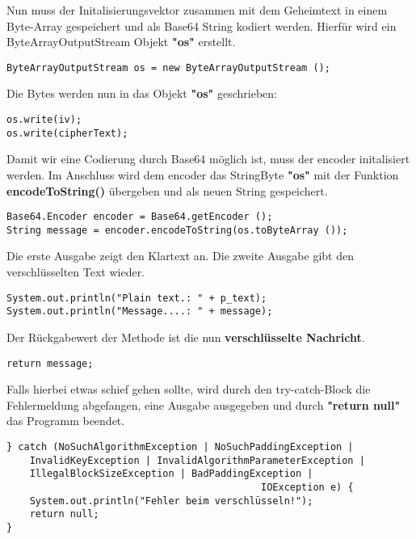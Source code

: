 \documentclass[12pt]{article}
\begin{document}
Nun muss der Initalisierungsvektor zusammen mit dem Geheimtext in einem Byte-Array gespeichert und als Base64 String kodiert werden. Hierfür wird ein ByteArrayOutputStream Objekt \textbf{"os"} erstellt.
\begin{lstlisting}
ByteArrayOutputStream os = new ByteArrayOutputStream ();
\end{lstlisting}
Die Bytes werden nun in das Objekt \textbf{"os"} geschrieben:
\begin{lstlisting}
os.write(iv);
os.write(cipherText);
\end{lstlisting}
Damit wir eine Codierung durch Base64 möglich ist, muss der encoder initalisiert werden. Im Anschluss wird dem encoder das StringByte \textbf{"os"} mit der Funktion \textbf{encodeToString()} übergeben und als neuen String gespeichert.
\begin{lstlisting}
Base64.Encoder encoder = Base64.getEncoder ();
String message = encoder.encodeToString(os.toByteArray ());
\end{lstlisting}
Die erste Ausgabe zeigt den Klartext an. Die zweite Ausgabe gibt den verschlüsselten Text wieder.
\begin{lstlisting}
System.out.println("Plain text.: " + p_text);
System.out.println("Message....: " + message);
\end{lstlisting}
Der Rückgabewert der Methode ist die nun \textbf{verschlüsselte Nachricht}.
\begin{lstlisting}
return message;
\end{lstlisting}

Falls hierbei etwas schief gehen sollte, wird durch den try-catch-Block die Fehlermeldung abgefangen, eine Ausgabe ausgegeben und durch \textbf{"return null"} das Programm beendet.
\begin{lstlisting}
} catch (NoSuchAlgorithmException | NoSuchPaddingException | 
    InvalidKeyException | InvalidAlgorithmParameterException | 
    IllegalBlockSizeException | BadPaddingException | 
                                            IOException e) {
	System.out.println("Fehler beim verschlüsseln!");
	return null;
}
\end{lstlisting}
\newpage
\end{document}
